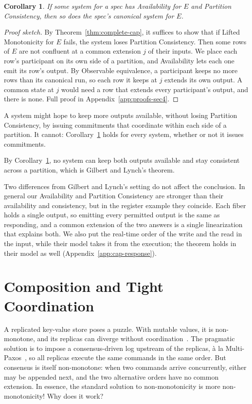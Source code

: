 \documentclass[sigconf]{cidr-2027}
\newtheorem{corollary}{Corollary}
\theoremstyle{remark}
\newcommand{\commitments}{commitments\xspace}
\newcommand{\outrel}{extends\xspace}          %
\begin{document}
\begin{corollary}
\label{cor:complete-cap-any-system}
\textcolor{reviewed}{If some system for a spec has Availability for $E$ and Partition Consistency,
then so does the spec's canonical system for $E$.}
\end{corollary}

\begin{proof}[Proof sketch]
By Theorem~\ref{thm:complete-cap}, it suffices to show that if Lifted
Monotonicity for $E$ fails, the system loses Partition Consistency. Then some
rows of $E$ are not confluent at a common extension $j$ of their inputs. We place each row's participant on
its own side of a partition, and Availability lets each one emit its row's
output. By Observable equivalence, a participant keeps no more rows than its
canonical run, so each row it keeps at $j$ \outrel its own output. A common
state at $j$ would need a row that \outrel every participant's output, and
there is none. Full proof in Appendix~\ref{app:proofs-sec4}.
\end{proof}

A system might hope to keep more outputs available, without losing Partition
Consistency, by issuing \commitments that coordinate within each side of a
partition. It cannot: Corollary~\ref{cor:complete-cap-any-system} holds for
every system, whether or not it issues \commitments.

\textcolor{reviewed}{By Corollary~\ref{cor:complete-cap-any-system}, no system can keep both outputs
available and stay consistent across a partition, which is Gilbert and Lynch's
theorem.}

Two differences from Gilbert and Lynch's setting do not affect the conclusion. In general our Availability and Partition Consistency are stronger than their
availability and consistency, but in the register example they coincide. Each
fiber holds a single output, so emitting every permitted output is the same as
responding, and a common extension of the two answers is a single linearization
that explains both. We also put the real-time order of the write and the read
in the input, while their model takes it from the execution; the theorem holds
in their model as well (Appendix~\ref{app:cap-response}).


\section{Composition and Tight Coordination}
\label{sec:composition}

\textcolor{reviewed}{A replicated key-value store poses a puzzle.} \textcolor{reviewed}{With mutable values, it is
non-monotone, and its replicas can diverge without coordination~\cite{alvaro2011bloom}.} \textcolor{reviewed}{The pragmatic solution is
to impose a consensus-driven log upstream of the replicas, \`a la
Multi-Paxos~\cite{lamport2001paxos}, so all replicas execute the same commands
in the same order.} But consensus is itself non-monotone: when two commands
arrive concurrently, either may be appended next, and the two alternative orders
have no common extension. \textcolor{reviewed}{In essence, the standard solution to non-monotonicity
is more non-monotonicity!} \textcolor{reviewed}{Why does it work?}
\end{document}
